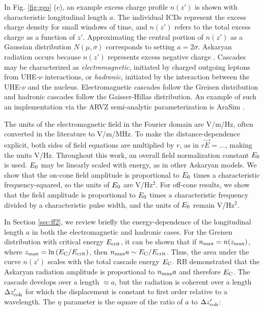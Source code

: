 \documentclass[amsmath,amssymb,aps,prd,10pt,twocolumn]{revtex4}
\begin{document}
In Fig. \ref{fig:geo} (c), an example excess charge profile $n(z')$ is shown with characteristic longitudinal length $a$.  The individual ICDs represent the excess charge density for small windows of time, and $n(z')$ refers to the total excess charge as a function of $z'$.  Approximating the central portion of $n(z')$ as a Gaussian distribution $N(\mu,\sigma)$ corresponds to setting $a = 2 \sigma$.  Askaryan radiation occurs because $n(z')$ represents excess negative charge \cite{zhs,PhysRevD.65.103002,10.1016/j.astropartphys.2017.03.008}.  Cascades may be characterized as \textit{electromagnetic}, initiated by charged outgoing leptons from UHE-$\nu$ interactions, or \textit{hadronic}, initiated by the interaction between the UHE-$\nu$ and the nucleus.  Electromagnetic cascades follow the Greisen distribution and hadronic cascades follow the Gaisser-Hillas distribution.  An example of such an implementation via the ARVZ semi-analytic parameterization is AraSim \cite{10.1016/j.astropartphys.2011.11.010}.

The units of the electromagnetic field in the Fourier domain are V/m/Hz, often converted in the literature to V/m/MHz. To make the distance-dependence explicit, both sides of field equations are multiplied by $r$, as in $r\vec{E} = ... $, making the units V/Hz. Throughout this work, an overall field normalization constant $E_{\rm 0}$ is used.  $E_{\rm 0}$ may be linearly scaled with energy, as in other Askaryan models.  We show that the on-cone field amplitude is proportional to $E_{\rm 0}$ times a characteristic frequency-squared, so the units of $E_{\rm 0}$ are V/Hz$^2$.  For off-cone results, we show that the field amplitude is proportional to $E_{\rm 0}$ times a characteristic frequency divided by a characteristic pulse width, and the units of $E_{\rm 0}$ remain V/Hz$^2$.

In Section \ref{sec:ff2}, we review briefly the energy-dependence of the longitudinal length $a$ in both the electromagnetic and hadronic cases.  For the Greisen distribution with critical energy $E_{\rm crit}$, it can be shown that if $n_{\rm max} = n(z_{\rm max})$, where $z_{\rm max} = \ln{(E_{\rm C}/E_{\rm crit})}$, then $n_{\rm max} a \sim E_{\rm C}/E_{\rm crit}$.  Thus, the area under the curve $n(z')$ scales with the total cascade energy $E_{\rm C}$.  RB demonstrated that the Askaryan radiation amplitude is proportional to $n_{\rm max} a$ and therefore $E_{\rm C}$.  The cascade develops over a length $\approx a$, but the radiation is coherent over a length $\Delta z'_{\rm coh}$ for which the displacement is constant to first order relative to a wavelength.  The $\eta$ parameter is the square of the ratio of $a$ to $\Delta z'_{\rm coh}$:
\end{document}
